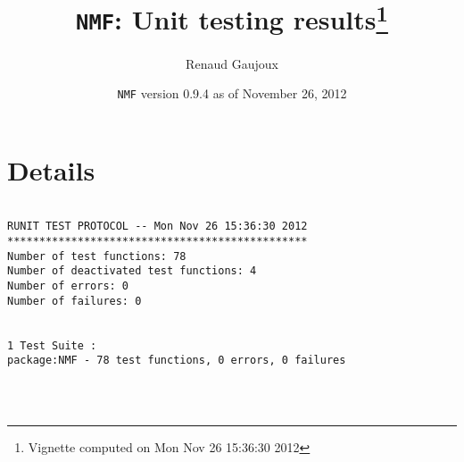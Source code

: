 \documentclass[10pt]{article}
\author{Renaud Gaujoux}
\title{\texttt{NMF}: Unit testing results\footnote{Vignette computed  on Mon Nov 26 15:36:30 2012}}
\date{\texttt{NMF} version 0.9.4 as of November 26, 2012}
\begin{document}
\maketitle

\section{Details}
\begin{verbatim}

RUNIT TEST PROTOCOL -- Mon Nov 26 15:36:30 2012 
*********************************************** 
Number of test functions: 78 
Number of deactivated test functions: 4 
Number of errors: 0 
Number of failures: 0 

 
1 Test Suite : 
package:NMF - 78 test functions, 0 errors, 0 failures




\end{verbatim}
\end{document}
